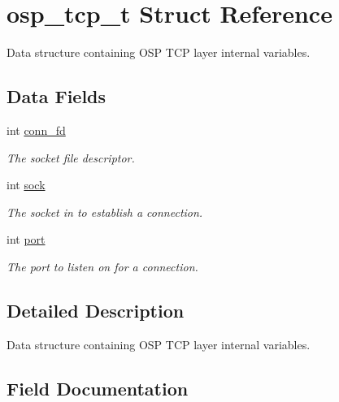 \hypertarget{structosp__tcp__t}{}\section{osp\+\_\+tcp\+\_\+t Struct Reference}
\label{structosp__tcp__t}


Data structure containing O\+SP T\+CP layer internal variables.  


\subsection*{Data Fields}
\begin{DoxyCompactItemize}
\item 
int \mbox{\hyperlink{structosp__tcp__t_afbf6dc5faef099a1e5a81e23d84290e7}{conn\+\_\+fd}}
\begin{DoxyCompactList}\small\item\em The socket file descriptor. \end{DoxyCompactList}\item 
int \mbox{\hyperlink{structosp__tcp__t_a944dbf95de27ec773bf9b4e169a30661}{sock}}
\begin{DoxyCompactList}\small\item\em The socket in to establish a connection. \end{DoxyCompactList}\item 
int \mbox{\hyperlink{structosp__tcp__t_a2b2fad6184d1ce632032645f85469657}{port}}
\begin{DoxyCompactList}\small\item\em The port to listen on for a connection. \end{DoxyCompactList}\end{DoxyCompactItemize}


\subsection{Detailed Description}
Data structure containing O\+SP T\+CP layer internal variables. 

\subsection{Field Documentation}
\mbox{\label{structosp__tcp__t_afbf6dc5faef099a1e5a81e23d84290e7}} 
